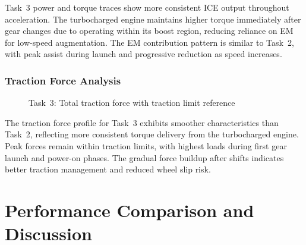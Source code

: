 Task~3 power and torque traces show more consistent ICE output throughout acceleration. The turbocharged engine maintains higher torque immediately after gear changes due to operating within its boost region, reducing reliance on EM for low-speed augmentation. The EM contribution pattern is similar to Task~2, with peak assist during launch and progressive reduction as speed increases.

\subsubsection{Traction Force Analysis}

\begin{figure}[H]
    \centering
    \caption{Task~3: Total traction force with traction limit reference}
    \label{fig:task3_traction}
\end{figure}

The traction force profile for Task~3 exhibits smoother characteristics than Task~2, reflecting more consistent torque delivery from the turbocharged engine. Peak forces remain within traction limits, with highest loads during first gear launch and power-on phases. The gradual force buildup after shifts indicates better traction management and reduced wheel slip risk.


\section{Performance Comparison and Discussion}


